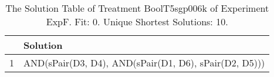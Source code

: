 \begin{table}[ht]
\centering
\begin{tabular}{rp{9cm}}
  \hline
 & Solution \\ 
  \hline
1 & AND(sPair(D3, D4), AND(sPair(D1, D6), sPair(D2, D5))) \\ 
   \hline
\end{tabular}
\caption{The Solution Table of Treatment BoolT5sgp006k of Experiment ExpF. Fit: 0. Unique Shortest Solutions: 10.} 
\end{table}

